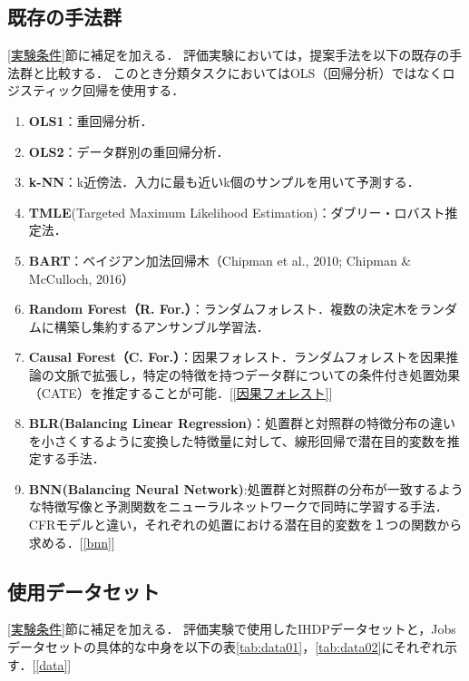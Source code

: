 \documentclass[dvipdfmx]{jreport}
\begin{document}
\subsection{既存の手法群}
\ref{実験条件}節に補足を加える．
評価実験においては，提案手法を以下の既存の手法群と比較する．
このとき分類タスクにおいてはOLS（回帰分析）ではなくロジスティック回帰を使用する．
\begin{tcolorbox}[title=\textbf{比較対象となる手法群}]
    \begin{enumerate}
        \item \textbf{OLS1}：重回帰分析．
        \item \textbf{OLS2}：データ群別の重回帰分析．
        \item \textbf{k-NN}：k近傍法．入力に最も近いk個のサンプルを用いて予測する．
        \item \textbf{TMLE}(Targeted Maximum Likelihood Estimation)：ダブリー・ロバスト推定法．
        \item \textbf{BART}：ベイジアン加法回帰木（Chipman et al., 2010; Chipman \& McCulloch, 2016）
        \item \textbf{Random Forest（R. For.）}：ランダムフォレスト．複数の決定木をランダムに構築し集約するアンサンブル学習法．
        \item \textbf{Causal Forest（C. For.）}：因果フォレスト．ランダムフォレストを因果推論の文脈で拡張し，特定の特徴を持つデータ群についての条件付き処置効果（CATE）を推定することが可能．[\ref{因果フォレスト}]
        \item \textbf{BLR(Balancing Linear Regression)}：処置群と対照群の特徴分布の違いを小さくするように変換した特徴量に対して、線形回帰で潜在目的変数を推定する手法．
        \item \textbf{BNN(Balancing Neural Network)}:処置群と対照群の分布が一致するような特徴写像と予測関数をニューラルネットワークで同時に学習する手法．CFRモデルと違い，それぞれの処置における潜在目的変数を１つの関数から求める．[\ref{bnn}]
    \end{enumerate}
\end{tcolorbox}

\subsection{使用データセット}
\ref{実験条件}節に補足を加える．
評価実験で使用したIHDPデータセットと，Jobsデータセットの具体的な中身を以下の表\ref{tab:data01}，\ref{tab:data02}にそれぞれ示す．[\ref{data}]
\end{document}
